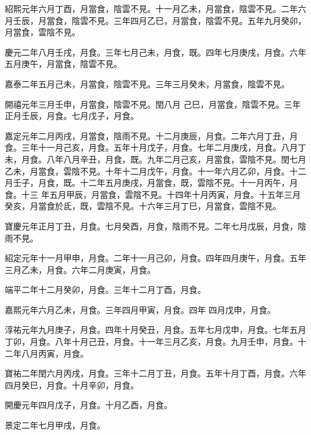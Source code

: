 \begin{pinyinscope}
 紹熙元年六月丁酉，月當食，陰雲不見。十一月乙未，月當食，陰雲不見。二年六月壬辰，月當食，陰雲不見。三年四月乙巳，月當食，陰雲不見。五年九月癸卯，月當食，雲陰不見。



 慶元二年八月壬戌，月食。三年七月己未，月食，既。四年七月庚戌，月食。六年五月庚午，月當食，陰雲不見。



 嘉泰二年五月己未，月當食，陰雲不見。三年三月癸未，月當食，陰雲不見。



 開禧元年三月壬申，月當食，陰雲不見。閏八月
 己巳，月當食，陰雲不見。三年正月壬辰，月食。七月戊子，月食。



 嘉定元年二月丙戌，月當食，陰雨不見。十二月庚辰，月食。二年六月丁丑，月食。三年十一月己亥，月食。五年十月戊子，月食。七年二月庚戌，月食。八月丁未，月食。八年八月辛丑，月食，既。九年二月己亥，月當食，雲陰不見。閏七月乙未，月當食，雲陰不見。十年十二月戊午，月食。十一年六月乙卯，月食。十二月壬子，月食，既。十二年五月庚戌，月當食，既，雲陰不見。十一月丙午，月食。十三
 年五月甲辰，月當食，雲陰不見。十四年十月丙寅，月食。十五年三月癸亥，月當食於氐，既，雲陰不見。十六年三月丁巳，月當食，雲陰不見。



 寶慶元年正月丁丑，月食。七月癸酉，月食，陰雨不見。二年七月戊辰，月食，陰雨不見。



 紹定元年十一月甲申，月食。二年十一月己卯，月食。四年四月庚午，月食。五年三月乙未，月食。六年二月庚寅，月食。



 端平二年十二月癸卯，月食。三年十二月丁酉，月食。



 嘉熙元年六月乙未，月食。三年四月甲寅，月食。四年
 四月戊申，月食。



 淳祐元年九月庚子，月食。四年十月癸丑，月食。五年七月戊申，月食。七年五月丁卯，月食。八年十月己丑，月食。十一年三月乙亥，月食。九月壬申，月食。十二年八月丙寅，月食。



 寶祐二年閏六月丙戌，月食。三年十二月丁丑，月食。五年十月丁酉，月食。六年四月癸巳，月食。十月辛卯，月食。



 開慶元年四月戊子，月食。十月乙酉，月食。



 景定二年七月甲戌，月食。




\end{pinyinscope}
